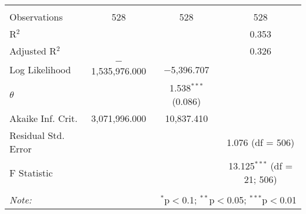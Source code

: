 \begin{table}[!htbp]
\begin{tabular}{@{\extracolsep{5pt}}lccc}
 \hline \\[-1.8ex] 
Observations & 528 & 528 & 528 \\ 
R$^{2}$ &  &  & 0.353 \\ 
Adjusted R$^{2}$ &  &  & 0.326 \\ 
Log Likelihood & $-$1,535,976.000 & $-$5,396.707 &  \\ 
$\theta$ &  & 1.538$^{***}$  (0.086) &  \\ 
Akaike Inf. Crit. & 3,071,996.000 & 10,837.410 &  \\ 
Residual Std. Error &  &  & 1.076 (df = 506) \\ 
F Statistic &  &  & 13.125$^{***}$ (df = 21; 506) \\ 
\hline 
\hline \\[-1.8ex] 
\textit{Note:}  & \multicolumn{3}{r}{$^{*}$p$<$0.1; $^{**}$p$<$0.05; $^{***}$p$<$0.01} \\ 
\end{tabular} 
\end{table} 
